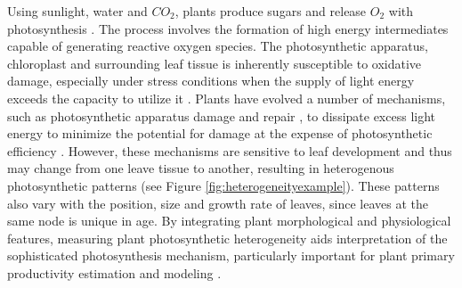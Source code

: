 Using sunlight, water and $CO_2$, plants produce sugars and release $O_2$ with photosynthesis \cite{kramer2011importance}. The process involves the formation of high energy intermediates capable of generating reactive oxygen species. The photosynthetic apparatus, chloroplast and surrounding leaf tissue is inherently susceptible to oxidative damage, especially under stress conditions when the supply of light energy exceeds the capacity to utilize it \cite{asada1996radical,durrant1990characterisation}. Plants have evolved a number of mechanisms, such as photosynthetic apparatus damage and repair \cite{melis1999photosystem}, to dissipate excess light energy to minimize the potential for damage at the expense of photosynthetic efficiency \cite{adams2006energy,rochaix2014regulation}. However, these mechanisms are sensitive to leaf development and thus may change from one leave tissue to another, resulting in heterogenous photosynthetic patterns (see Figure \ref{fig:heterogeneityexample}). These patterns also vary with the position, size and growth rate of leaves, since leaves at the same node is unique in age. By integrating plant morphological and physiological features, measuring plant photosynthetic heterogeneity aids interpretation of the sophisticated photosynthesis mechanism, particularly important for plant primary productivity estimation and modeling \cite{meng2007spatial}.




